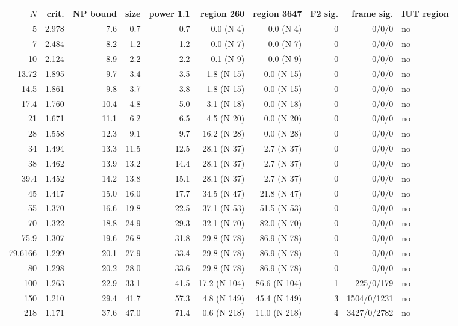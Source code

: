 \begin{tabular}{rrrrrrrrrl}
\toprule
$N$ & crit. & NP bound & size & power 1.1 & region 260 & region 3647 & F2 sig. & frame sig. & IUT region\\
\midrule
5 & 2.978 & 7.6 & 0.7 & 0.7 & 0.0 (N 4) & 0.0 (N 4) & 0 & 0/0/0 & no\\
7 & 2.484 & 8.2 & 1.2 & 1.2 & 0.0 (N 7) & 0.0 (N 7) & 0 & 0/0/0 & no\\
10 & 2.124 & 8.9 & 2.2 & 2.2 & 0.1 (N 9) & 0.0 (N 9) & 0 & 0/0/0 & no\\
13.72 & 1.895 & 9.7 & 3.4 & 3.5 & 1.8 (N 15) & 0.0 (N 15) & 0 & 0/0/0 & no\\
14.5 & 1.861 & 9.8 & 3.7 & 3.8 & 1.8 (N 15) & 0.0 (N 15) & 0 & 0/0/0 & no\\
17.4 & 1.760 & 10.4 & 4.8 & 5.0 & 3.1 (N 18) & 0.0 (N 18) & 0 & 0/0/0 & no\\
21 & 1.671 & 11.1 & 6.2 & 6.5 & 4.5 (N 20) & 0.0 (N 20) & 0 & 0/0/0 & no\\
28 & 1.558 & 12.3 & 9.1 & 9.7 & 16.2 (N 28) & 0.0 (N 28) & 0 & 0/0/0 & no\\
34 & 1.494 & 13.3 & 11.5 & 12.5 & 28.1 (N 37) & 2.7 (N 37) & 0 & 0/0/0 & no\\
38 & 1.462 & 13.9 & 13.2 & 14.4 & 28.1 (N 37) & 2.7 (N 37) & 0 & 0/0/0 & no\\
39.4 & 1.452 & 14.2 & 13.8 & 15.1 & 28.1 (N 37) & 2.7 (N 37) & 0 & 0/0/0 & no\\
45 & 1.417 & 15.0 & 16.0 & 17.7 & 34.5 (N 47) & 21.8 (N 47) & 0 & 0/0/0 & no\\
55 & 1.370 & 16.6 & 19.8 & 22.5 & 37.1 (N 53) & 51.5 (N 53) & 0 & 0/0/0 & no\\
70 & 1.322 & 18.8 & 24.9 & 29.3 & 32.1 (N 70) & 82.0 (N 70) & 0 & 0/0/0 & no\\
75.9 & 1.307 & 19.6 & 26.8 & 31.8 & 29.8 (N 78) & 86.9 (N 78) & 0 & 0/0/0 & no\\
79.6166 & 1.299 & 20.1 & 27.9 & 33.4 & 29.8 (N 78) & 86.9 (N 78) & 0 & 0/0/0 & no\\
80 & 1.298 & 20.2 & 28.0 & 33.6 & 29.8 (N 78) & 86.9 (N 78) & 0 & 0/0/0 & no\\
100 & 1.263 & 22.9 & 33.1 & 41.5 & 17.2 (N 104) & 86.6 (N 104) & 1 & 225/0/179 & no\\
150 & 1.210 & 29.4 & 41.7 & 57.3 & 4.8 (N 149) & 45.4 (N 149) & 3 & 1504/0/1231 & no\\
218 & 1.171 & 37.6 & 47.0 & 71.4 & 0.6 (N 218) & 11.0 (N 218) & 4 & 3427/0/2782 & no\\
\bottomrule
\end{tabular}
